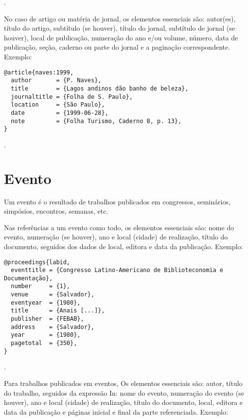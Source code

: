 \noindent
{}.

\vspace*{1em}

No caso de artigo ou matéria de jornal, os elementos essenciais são: autor(es), título do artigo, subtítulo (se houver), título do jornal, subtítulo de jornal (se houver), local de publicação, numeração do ano e/ou volume, número, data de publicação, seção, caderno ou parte do jornal e a paginação correspondente.
Exemplo:

\vspace*{1em}

\begin{verbatim}
@article{naves:1999,
  author       = {P. Naves},
  title        = {Lagos andinos dão banho de beleza},
  journaltitle = {Folha de S. Paulo},
  location     = {São Paulo},
  date         = {1999-06-28},
  note         = {Folha Turismo, Caderno 8, p. 13},
}
\end{verbatim}

\noindent
{}.

\section{Evento}

Um evento é o resultado de trabalhos publicados em congressos, seminários, simpósios, encontros, semanas, etc.

Nas referências a um evento como todo, os elementos essenciais são: nome do evento, numeração (se houver), ano e local (cidade) de realização, título do documento, seguidos dos dados de local, editora e data da publicação.
Exemplo:

\vspace*{1em}


\begin{verbatim}
@proceedings{labid,
  eventtitle = {Congresso Latino-Americano de Biblioteconomia e Documentação},
  number     = {1},
  venue      = {Salvador},
  eventyear  = {1980},
  title      = {Anais [...]},
  publisher  = {FEBAB},
  address    = {Salvador},
  year       = {1980},
  pagetotal  = {350},
}
\end{verbatim}

\noindent
{}.

\vspace*{1em}

Para trabalhos publicados em eventos, Os elementos essenciais são: autor, título do trabalho, seguidos da expressão In: nome do evento, numeração do evento (se houver), ano e local (cidade) de realização, título do documento, local, editora e data da publicação e páginas inicial e final da parte referenciada.
Exemplo:

